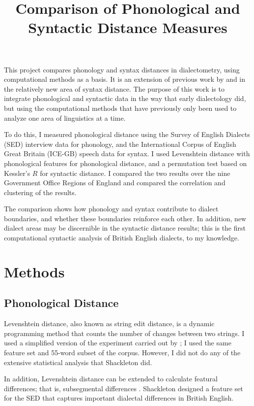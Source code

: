 \documentclass[11pt,letterpaper]{article}
\begin{document}
\title{Comparison of Phonological and Syntactic Distance Measures}

\maketitle

This project compares phonology and syntax distances in dialectometry,
using computational methods as a basis. It is an extension of
previous work by \cite{nerbonne06} and
\cite{sanders07} in the relatively new area of syntax
distance. The purpose of this work is to integrate phonological and
syntactic data in the way that early dialectology did, but using the
computational methods that have previously only been used to analyze
one area of linguistics at a time.

To do this, I measured phonological distance using the Survey of
English Dialects (SED) \cite{orton63} interview data for phonology,
and the International Corpus of English Great Britain (ICE-GB) \cite{nelson02} speech
data for syntax. I used Levenshtein distance \cite{lev65} with
phonological features \cite{nerbonne97} for phonological distance, and
a permutation test based on Kessler's $R$ \cite{kessler01} for
syntactic distance. I compared the two results over
the nine Government Office Regions of England and compared the
correlation and clustering of the results.

The comparison shows how phonology and syntax contribute to dialect
boundaries, and whether these boundaries reinforce each other. In
addition, new dialect areas may be discernible in the syntactic
distance results; this is the first computational syntactic
analysis of British English dialects, to my knowledge.

\section{Methods}
\subsection{Phonological Distance}
Levenshtein distance, also known as string edit distance, is a dynamic
programming method that counts the number of changes between two
strings. I used a simplified version of the experiment carried out by
; I used the same feature set and 55-word subset of
the corpus. However, I did not do any of the extensive statistical
analysis that Shackleton did.

In addition, Levenshtein distance can be extended to calculate featural
differences; that is, subsegmental differences
\cite{heeringa04}. Shackleton designed a feature set for the SED that
captures important dialectal differences in British English.
\end{document}
